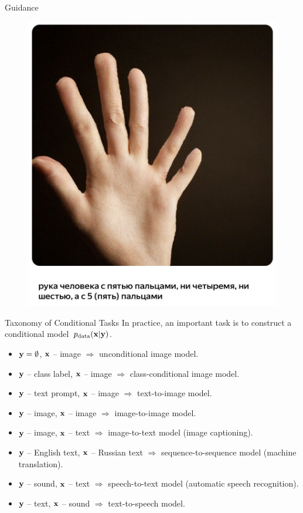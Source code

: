 \documentclass{beamer}
\begin{document}
\begin{frame}{Guidance}
\begin{minipage}[t]{0.5\columnwidth}
\begin{figure}
			\includegraphics[width=0.9\linewidth]{figs/shedevrum2}
		\end{figure}
	\end{minipage}
\end{frame}
\begin{frame}{Taxonomy of Conditional Tasks}
	In practice, an important task is to construct a conditional model~$p_{\text{data}}(\mathbf{x} | \mathbf{y})$. 
		\begin{itemize}
			\item $\mathbf{y} = \emptyset$, $\mathbf{x}$ -- image $\Rightarrow$ unconditional image model.
			\item $\mathbf{y}$ -- class label, $\mathbf{x}$ -- image $\Rightarrow$ class-conditional image model.
			\item $\mathbf{y}$ -- text prompt, $\mathbf{x}$ -- image $\Rightarrow$ text-to-image model.
			\item $\mathbf{y}$ -- image, $\mathbf{x}$ -- image $\Rightarrow$ image-to-image model.
			\item $\mathbf{y}$ -- image, $\mathbf{x}$ -- text $\Rightarrow$ image-to-text model (image captioning).
			\item $\mathbf{y}$ -- English text, $\mathbf{x}$ -- Russian text $\Rightarrow$ sequence-to-sequence model (machine translation).
			\item $\mathbf{y}$ -- sound, $\mathbf{x}$ -- text $\Rightarrow$ speech-to-text model (automatic speech recognition).
			\item $\mathbf{y}$ -- text, $\mathbf{x}$ -- sound $\Rightarrow$ text-to-speech model.
		\end{itemize}
\end{frame}
\end{document}
